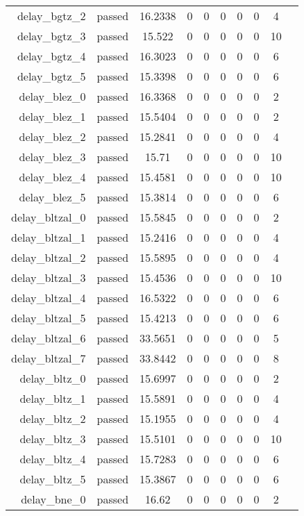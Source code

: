 \begin{longtable}{r|ccccccccc}
    delay\_bgtz\_2 & passed & 16.2338 & 0 & 0 & 0 & 0 & 0 & 4 \\
    delay\_bgtz\_3 & passed & 15.522 & 0 & 0 & 0 & 0 & 0 & 10 \\
    delay\_bgtz\_4 & passed & 16.3023 & 0 & 0 & 0 & 0 & 0 & 6 \\
    delay\_bgtz\_5 & passed & 15.3398 & 0 & 0 & 0 & 0 & 0 & 6 \\
    delay\_blez\_0 & passed & 16.3368 & 0 & 0 & 0 & 0 & 0 & 2 \\
    delay\_blez\_1 & passed & 15.5404 & 0 & 0 & 0 & 0 & 0 & 2 \\
    delay\_blez\_2 & passed & 15.2841 & 0 & 0 & 0 & 0 & 0 & 4 \\
    delay\_blez\_3 & passed & 15.71 & 0 & 0 & 0 & 0 & 0 & 10 \\
    delay\_blez\_4 & passed & 15.4581 & 0 & 0 & 0 & 0 & 0 & 10 \\
    delay\_blez\_5 & passed & 15.3814 & 0 & 0 & 0 & 0 & 0 & 6 \\
    delay\_bltzal\_0 & passed & 15.5845 & 0 & 0 & 0 & 0 & 0 & 2 \\
    delay\_bltzal\_1 & passed & 15.2416 & 0 & 0 & 0 & 0 & 0 & 4 \\
    delay\_bltzal\_2 & passed & 15.5895 & 0 & 0 & 0 & 0 & 0 & 4 \\
    delay\_bltzal\_3 & passed & 15.4536 & 0 & 0 & 0 & 0 & 0 & 10 \\
    delay\_bltzal\_4 & passed & 16.5322 & 0 & 0 & 0 & 0 & 0 & 6 \\
    delay\_bltzal\_5 & passed & 15.4213 & 0 & 0 & 0 & 0 & 0 & 6 \\
    delay\_bltzal\_6 & passed & 33.5651 & 0 & 0 & 0 & 0 & 0 & 5 \\
    delay\_bltzal\_7 & passed & 33.8442 & 0 & 0 & 0 & 0 & 0 & 8 \\
    delay\_bltz\_0 & passed & 15.6997 & 0 & 0 & 0 & 0 & 0 & 2 \\
    delay\_bltz\_1 & passed & 15.5891 & 0 & 0 & 0 & 0 & 0 & 4 \\
    delay\_bltz\_2 & passed & 15.1955 & 0 & 0 & 0 & 0 & 0 & 4 \\
    delay\_bltz\_3 & passed & 15.5101 & 0 & 0 & 0 & 0 & 0 & 10 \\
    delay\_bltz\_4 & passed & 15.7283 & 0 & 0 & 0 & 0 & 0 & 6 \\
    delay\_bltz\_5 & passed & 15.3867 & 0 & 0 & 0 & 0 & 0 & 6 \\
    delay\_bne\_0 & passed & 16.62 & 0 & 0 & 0 & 0 & 0 & 2 \\

\end{longtable}
